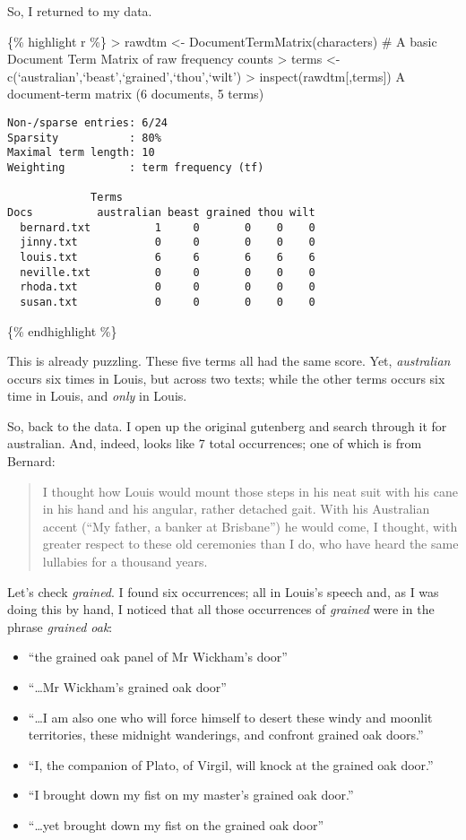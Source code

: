 \documentclass[
  12pt,
]{article}
\providecommand{\tightlist}{%
  \setlength{\itemsep}{0pt}\setlength{\parskip}{0pt}}
\begin{document}
So, I returned to my data.

\{\% highlight r \%\} \textgreater{} rawdtm \textless-
DocumentTermMatrix(characters) \# A basic Document Term Matrix of raw
frequency counts \textgreater{} terms \textless-
c(`australian',`beast',`grained',`thou',`wilt') \textgreater{}
inspect(rawdtm{[},terms{]}) A document-term matrix (6 documents, 5
terms)

\begin{verbatim}
Non-/sparse entries: 6/24
Sparsity           : 80%
Maximal term length: 10 
Weighting          : term frequency (tf)

             Terms
Docs          australian beast grained thou wilt
  bernard.txt          1     0       0    0    0
  jinny.txt            0     0       0    0    0
  louis.txt            6     6       6    6    6
  neville.txt          0     0       0    0    0
  rhoda.txt            0     0       0    0    0
  susan.txt            0     0       0    0    0
\end{verbatim}

\{\% endhighlight \%\}

This is already puzzling. These five terms all had the same score. Yet,
\emph{australian} occurs six times in Louis, but across two texts; while
the other terms occurs six time in Louis, and \emph{only} in Louis.

So, back to the data. I open up the original gutenberg and search
through it for australian. And, indeed, looks like 7 total occurrences;
one of which is from Bernard:

\begin{quote}
I thought how Louis would mount those steps in his neat suit with his
cane in his hand and his angular, rather detached gait. With his
Australian accent (``My father, a banker at Brisbane'') he would come, I
thought, with greater respect to these old ceremonies than I do, who
have heard the same lullabies for a thousand years.
\end{quote}

Let's check \emph{grained}. I found six occurrences; all in Louis's
speech and, as I was doing this by hand, I noticed that all those
occurrences of \emph{grained} were in the phrase \emph{grained oak}:

\begin{itemize}
\tightlist
\item
  ``the grained oak panel of Mr Wickham's door''
\item
  ``\ldots Mr Wickham's grained oak door''
\item
  ``\ldots I am also one who will force himself to desert these windy
  and moonlit territories, these midnight wanderings, and confront
  grained oak doors.''
\item
  ``I, the companion of Plato, of Virgil, will knock at the grained oak
  door.''
\item
  ``I brought down my fist on my master's grained oak door.''
\item
  ``\ldots yet brought down my fist on the grained oak door''
\end{itemize}
\end{document}
